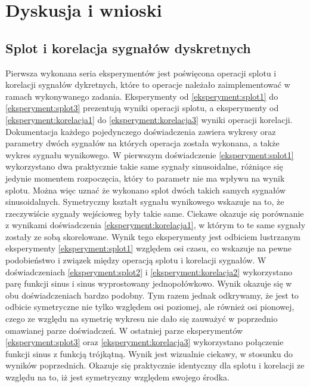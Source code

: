 \documentclass[12pt]{article}
\begin{document}
    \section{Dyskusja i wnioski} {

        \subsection{Splot i korelacja sygnałów dyskretnych} {
            Pierwsza wykonana seria eksperymentów jest poświęcona operacji splotu i
            korelacji sygnałów dykretnych, które to operacje należało zaimplementować w
            ramach wykonywanego zadania. Eksperymenty od \ref{eksperyment:splot1} do
            \ref{eksperyment:splot3} prezentują wyniki operacji splotu, a eksperymenty od
            \ref{eksperyment:korelacja1} do \ref{eksperyment:korelacja3} wyniki operacji
            korelacji. Dokumentacja każdego pojedynczego doświadczenia zawiera wykresy
            oraz parametry dwóch sygnałów na których operacja została wykonana, a także
            wykres sygnału wynikowego. W pierwszym doświadczenie \ref{eksperyment:splot1}
            wykorzystano dwa praktycznie takie same sygnały sinusoidalne, różniące się
            jedynie momentem rozpoczęcia, który to parametr nie ma wpływu na wynik
            splotu. Można więc uznać że wykonano splot dwóch takich samych sygnałów
            sinusoidalnych. Symetryczny kształt sygnału wynikowego wskazuje na to, że
            rzeczywiście sygnały wejścioweg były takie same. Ciekawe okazuje się
            porównanie z wynikami doświadczenia \ref{eksperyment:korelacja1}, w którym to
            te same sygnały zostały ze sobą skorelowane. Wynik tego eksperymenty jest
            odbiciem lustrzanym eksperymenty \ref{eksperyment:splot1} względem osi czasu,
            co wskazuje na pewne podobieństwo i związek między operacją splotu i korelacji
            sygnałów. W doświadczeniach \ref{eksperyment:splot2} i
            \ref{eksperyment:korelacja2} wykorzystano parę funkcji sinus i sinus
            wyprostowany jednopołówkowo. Wynik okazuje się w obu doświadczeniach bardzo
            podobny. Tym razem jednak odkrywamy, że jest to odbicie symetryczne nie tylko
            względem osi poziomej, ale również osi pionowej, czego ze względu na symetrię
            wykresu nie dało się zauważyć w poprzednio omawianej parze doświadczeń. W
            ostatniej parze eksperymentów \ref{eksperyment:splot3} oraz
            \ref{eksperyment:korelacja3} wykorzystano połączenie funkcji sinus z funkcją
            trójkątną. Wynik jest wizualnie ciekawy, w stosunku do wyników poprzednich.
            Okazuje się praktycznie identyczny dla splotu i korelacji ze względu na to,
            iż jest symetryczny względem swojego środka.
        }

}
\end{document}
